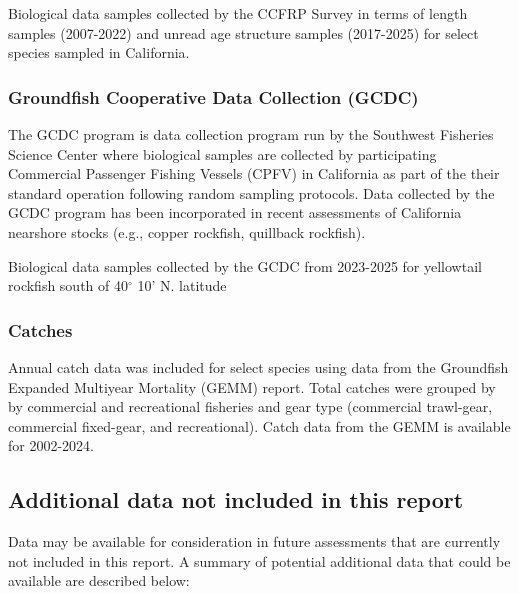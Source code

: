 \documentclass[
  english,
]{article}
\begin{document}
Biological data samples collected by the CCFRP Survey in terms of length
samples (2007-2022) and unread age structure samples (2017-2025) for
select species sampled in California.

\subsubsection{Groundfish Cooperative Data Collection
(GCDC)}\label{groundfish-cooperative-data-collection-gcdc}

The GCDC program is data collection program run by the Southwest
Fisheries Science Center where biological samples are collected by
participating Commercial Passenger Fishing Vessels (CPFV) in California
as part of the their standard operation following random sampling
protocols. Data collected by the GCDC program has been incorporated in
recent assessments of California nearshore stocks (e.g., copper
rockfish, quillback rockfish).

Biological data samples collected by the GCDC from 2023-2025 for
yellowtail rockfish south of 40\(^\circ\) 10' N. latitude

\subsubsection{Catches}\label{catches}

Annual catch data was included for select species using data from the
Groundfish Expanded Multiyear Mortality (GEMM) report. Total catches
were grouped by by commercial and recreational fisheries and gear type
(commercial trawl-gear, commercial fixed-gear, and recreational). Catch
data from the GEMM is available for 2002-2024.

\subsection{Additional data not included in this
report}\label{additional-data-not-included-in-this-report}

Data may be available for consideration in future assessments that are
currently not included in this report. A summary of potential additional
data that could be available are described below:
\end{document}
